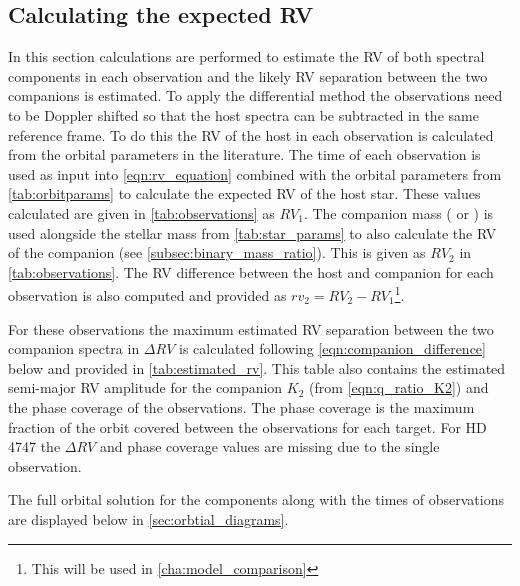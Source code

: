 
\subsection{Calculating the expected {RV}}
\label{subsec:expected_RV_calc}
In this section calculations are performed to estimate the {RV} of both spectral components in each observation and the likely {RV} separation between the two companions is estimated.
To apply the differential method the observations need to be Doppler shifted so that the host spectra can be subtracted in the same reference frame.
To do this the {RV} of the host in each observation is calculated from the orbital parameters in the literature.
The time of each observation is used as input into \cref{eqn:rv_equation} combined with the orbital parameters from \cref{tab:orbitparams} to calculate the expected {RV} of the host star.
These values calculated are given in \cref{tab:observations} as \({RV}_{1}\).
The companion mass (\Mtwo{} or \Mtwosini{}) is used alongside the stellar mass from \cref{tab:star_params} to also calculate the {RV} of the companion (see \cref{subsec:binary_mass_ratio}).
This is given as \({RV}_{2}\) in \cref{tab:observations}.
The {RV} difference between the host and companion for each observation is also computed and provided as \({rv}_{2} = {RV}_{2}-{RV}_{1}\)\footnote{This will be used in \cref{cha:model_comparison}}.

For these observations the maximum estimated {RV} separation between the two companion spectra in \(\Delta {RV}\) is calculated following \cref{eqn:companion_difference} below and provided in \cref{tab:estimated_rv}.
This table also contains the estimated semi-major {RV} amplitude for the companion \(K_2\) (from \cref{eqn:q_ratio_K2}) and the phase coverage of the observations.
The phase coverage is the maximum fraction of the orbit covered between the observations for each target.
For {HD\,4747} the \(\Delta {RV}\) and phase coverage values are missing due to the single observation.




The full orbital solution for the components along with the times of observations are displayed below in \cref{sec:orbtial_diagrams}.


